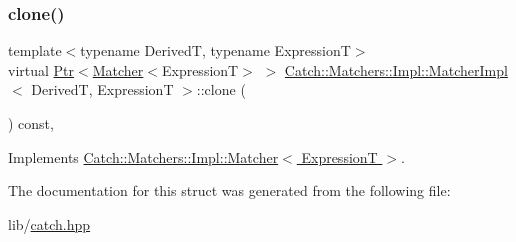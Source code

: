 \subsubsection{\texorpdfstring{clone()}{clone()}}
{\footnotesize\ttfamily template$<$typename DerivedT, typename ExpressionT$>$ \\
virtual \hyperlink{class_catch_1_1_ptr}{Ptr}$<$\hyperlink{struct_catch_1_1_matchers_1_1_impl_1_1_matcher}{Matcher}$<$ExpressionT$>$ $>$ \hyperlink{struct_catch_1_1_matchers_1_1_impl_1_1_matcher_impl}{Catch\+::\+Matchers\+::\+Impl\+::\+Matcher\+Impl}$<$ DerivedT, ExpressionT $>$\+::clone (\begin{DoxyParamCaption}{ }\end{DoxyParamCaption}) const\hspace{0.3cm}{\ttfamily [inline]}, {\ttfamily [virtual]}}



Implements \hyperlink{struct_catch_1_1_matchers_1_1_impl_1_1_matcher_a9d31e5018fea24efa08c3cbf5aa4475d}{Catch\+::\+Matchers\+::\+Impl\+::\+Matcher$<$ Expression\+T $>$}.



The documentation for this struct was generated from the following file\+:\begin{DoxyCompactItemize}
\item 
lib/\hyperlink{catch_8hpp}{catch.\+hpp}\end{DoxyCompactItemize}
